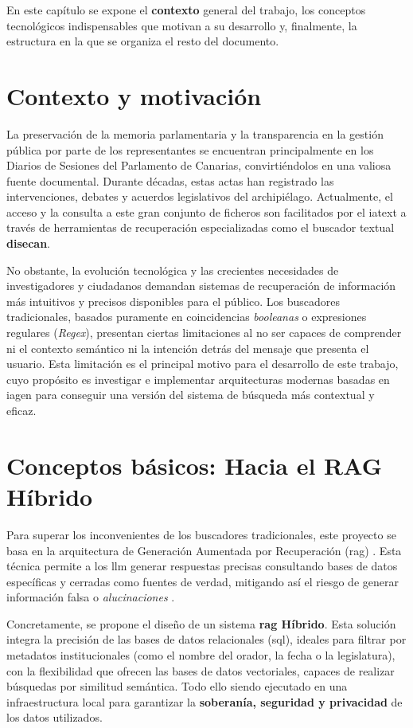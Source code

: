 En este capítulo se expone el \textbf{contexto} general del trabajo, los conceptos tecnológicos indispensables que motivan a su desarrollo y, finalmente, la estructura en la que se organiza el resto del documento.

\section{Contexto y motivación}
La preservación de la memoria parlamentaria y la transparencia en la gestión pública por parte de los representantes se encuentran principalmente en los Diarios de Sesiones del Parlamento de Canarias, convirtiéndolos en una valiosa fuente documental. Durante décadas, estas actas han registrado las intervenciones, debates y acuerdos legislativos del archipiélago. Actualmente, el acceso y la consulta a este gran conjunto de ficheros son facilitados por el \gls{iatext} \cite{iatext_web} a través de herramientas de recuperación especializadas como el buscador textual \textbf{\gls{disecan}}.

No obstante, la evolución tecnológica y las crecientes necesidades de investigadores y ciudadanos demandan sistemas de recuperación de información más intuitivos y precisos disponibles para el público. Los buscadores tradicionales, basados puramente en coincidencias \textit{booleanas} o expresiones regulares (\textit{Regex}), presentan ciertas limitaciones al no ser capaces de comprender ni el contexto semántico ni la intención detrás del mensaje que presenta el usuario. Esta limitación es el principal motivo para el desarrollo de este trabajo, cuyo propósito es investigar e implementar arquitecturas modernas basadas en \gls{iagen} para conseguir una versión del sistema de búsqueda más contextual y eficaz.

\section{Conceptos básicos: Hacia el RAG Híbrido}
Para superar los inconvenientes de los buscadores tradicionales, este proyecto se basa en la arquitectura de Generación Aumentada por Recuperación (\gls{rag}) \cite{lewis2020rag}. Esta técnica permite a los \gls{llm} generar respuestas precisas consultando bases de datos específicas y cerradas como fuentes de verdad, mitigando así el riesgo de generar información falsa o \textit{alucinaciones} \cite{ji2023hallucination}.


Concretamente, se propone el diseño de un sistema \textbf{\gls{rag} Híbrido}. Esta solución integra la precisión de las bases de datos relacionales (\gls{sql}), ideales para filtrar por metadatos institucionales (como el nombre del orador, la fecha o la legislatura), con la flexibilidad que ofrecen las bases de datos vectoriales, capaces de realizar búsquedas por similitud semántica. Todo ello siendo ejecutado en una infraestructura local para garantizar la \textbf{soberanía, seguridad y privacidad} de los datos utilizados.

